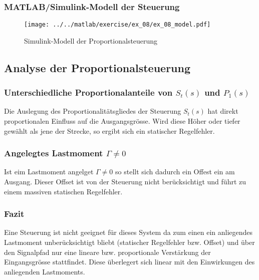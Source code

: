 \subsubsection{MATLAB/Simulink-Modell der Steuerung}



\begin{figure}[h!]
	\centering
	\texttt{[image: ../../matlab/exercise/ex\_08/ex\_08\_model.pdf]}
	\caption{Simulink-Modell der Proportionalsteuerung}
\end{figure}

\subsection{Analyse der Proportionalsteuerung}

\subsubsection{Unterschiedliche Proportionalanteile von $S_t(s)$ und $P_1(s)$}
Die Auslegung des Proportionalitätsgliedes der Steuerung $S_t(s)$ hat direkt
proportionalen Einfluss auf die Ausgangsgrösse. Wird diese Höher oder tiefer
gewählt als jene der Strecke, so ergibt sich ein statischer Regelfehler.

\subsubsection{Angelegtes Lastmoment $\Gamma \neq 0$}
Ist eim Lastmoment angelget $\Gamma \neq 0$ so stellt sich dadurch ein Offest
ein am Ausgang. Dieser Offset ist von der Steuerung nicht berücksichtigt und
führt zu einem massiven statischen Regelfehler.

\subsubsection{Fazit}
Eine Steuerung ist nicht geeignet für dieses System da zum einen ein
anliegendes Lastmoment unberücksichtigt bliebt (statischer Regelfehler bzw.
Offset) und über den Signalpfad nur eine lineare bzw. proportionale
Verstärkung der Eingangsgrösse stattfindet. Diese überlegert sich linear mit
den Einwirkungen des anliegenden Lastmoments.
